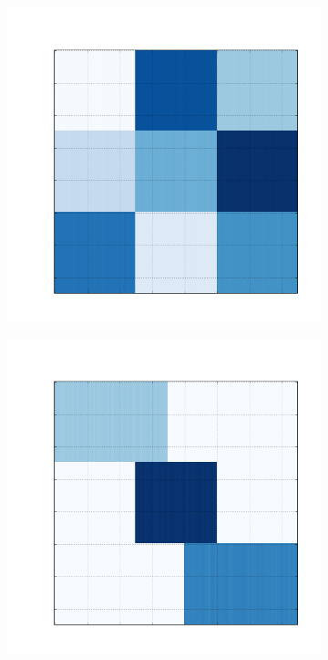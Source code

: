\documentclass[
    12pt,                %
    oneside,            %
    a4paper,            %
    english,            %
    brazil                %
    ]{abntex2ppgsi}
\begin{document}
\begin{figure}[H]
\begin{subfigure}[b]{0.18\textwidth}
        \caption{}
    \end{subfigure}
    \begin{subfigure}[b]{0.18\textwidth}
        \includegraphics[width=\textwidth]{img/c-reconstruction-kmeans.png}
        \caption{}
    \end{subfigure}
    \begin{subfigure}[b]{0.18\textwidth}
        \includegraphics[width=\textwidth]{img/d-reconstruction-kmeans.png}

\end{subfigure}
\end{figure}
\end{document}
